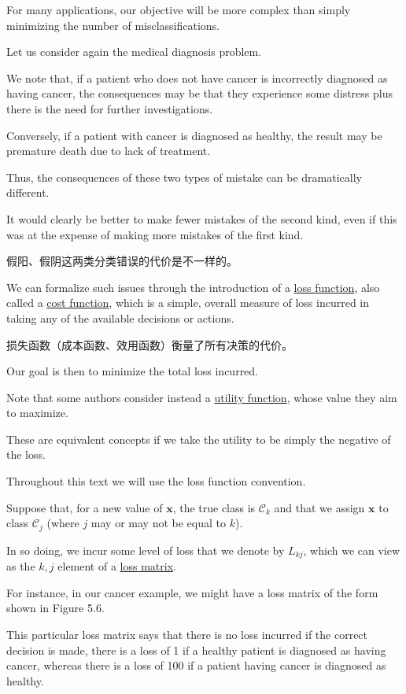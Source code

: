 \documentclass{article}
\begin{document}
For many applications, our objective will be more complex than simply minimizing the number of misclassifications. 

Let us consider again the medical diagnosis problem. 

We note that, if a patient who does not have cancer is incorrectly diagnosed as having cancer, the consequences may be that they experience some distress plus there is the need for further investigations. 

Conversely, if a patient with cancer is diagnosed as healthy, the result may be premature death due to lack of treatment. 

Thus, the consequences of these two types of mistake can be dramatically different. 

It would clearly be better to make fewer mistakes of the second kind, even if this was at the expense of making more mistakes of the first kind.

{\color{red}
假阳、假阴这两类分类错误的代价是不一样的。
}

We can formalize such issues through the introduction of a \underline{\color{red}loss function}, also called a \underline{\color{red}cost function}, which is a simple, overall measure of loss incurred in taking any of the available decisions or actions. 

{\color{red}
损失函数（成本函数、效用函数）衡量了所有决策的代价。
}

Our goal is then to minimize the total loss incurred. 

Note that some authors consider instead a \underline{\color{red}utility function}, whose value they aim to maximize. 

These are equivalent concepts if we take the utility to be simply the negative of the loss. 

Throughout this text we will use the loss function convention. 

Suppose that, for a new value of $\mathbf{x}$, the true class is $\mathcal{C}_{k}$ and that we assign $\mathbf{x}$ to class $\mathcal{C}_{j}$ (where $j$ may or may not be equal to $k$). 

In so doing, we incur some level of loss that we denote by $L_{kj}$, which we can view as the $k,j$ element of a \underline{\color{red}loss matrix}. 

For instance, in our cancer example, we might have a loss matrix of the form shown in Figure 5.6. 

This particular loss matrix says that there is no loss incurred if the correct decision is made, there is a loss of 1 if a healthy patient is diagnosed as having cancer, whereas there is a loss of 100 if a patient having cancer is diagnosed as healthy.
\end{document}
